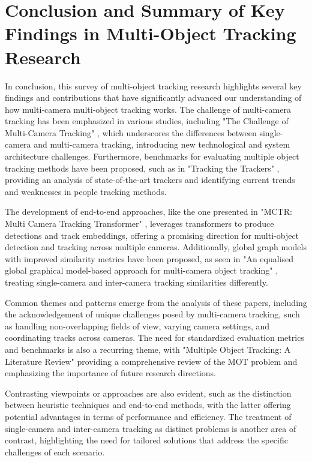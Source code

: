 \documentclass[conference]{IEEEtran}
\begin{document}
\section{Conclusion and Summary of Key Findings in Multi-Object Tracking Research}
In conclusion, this survey of multi-object tracking research highlights several key findings and contributions that have significantly advanced our understanding of how multi-camera multi-object tracking works. The challenge of multi-camera tracking has been emphasized in various studies, including "The Challenge of Multi-Camera Tracking" \cite{The Challenge of Multi-Camera Tracking}, which underscores the differences between single-camera and multi-camera tracking, introducing new technological and system architecture challenges. Furthermore, benchmarks for evaluating multiple object tracking methods have been proposed, such as in "Tracking the Trackers" \cite{Tracking the Trackers}, providing an analysis of state-of-the-art trackers and identifying current trends and weaknesses in people tracking methods.

The development of end-to-end approaches, like the one presented in "MCTR: Multi Camera Tracking Transformer" \cite{MCTR: Multi Camera Tracking Transformer}, leverages transformers to produce detections and track embeddings, offering a promising direction for multi-object detection and tracking across multiple cameras. Additionally, global graph models with improved similarity metrics have been proposed, as seen in "An equalised global graphical model-based approach for multi-camera object tracking" \cite{An equalised global graphical model-based approach for multi-camera object tracking}, treating single-camera and inter-camera tracking similarities differently.

Common themes and patterns emerge from the analysis of these papers, including the acknowledgement of unique challenges posed by multi-camera tracking, such as handling non-overlapping fields of view, varying camera settings, and coordinating tracks across cameras. The need for standardized evaluation metrics and benchmarks is also a recurring theme, with "Multiple Object Tracking: A Literature Review" \cite{Multiple Object Tracking: A Literature Review} providing a comprehensive review of the MOT problem and emphasizing the importance of future research directions.

Contrasting viewpoints or approaches are also evident, such as the distinction between heuristic techniques and end-to-end methods, with the latter offering potential advantages in terms of performance and efficiency. The treatment of single-camera and inter-camera tracking as distinct problems is another area of contrast, highlighting the need for tailored solutions that address the specific challenges of each scenario.
\end{document}
